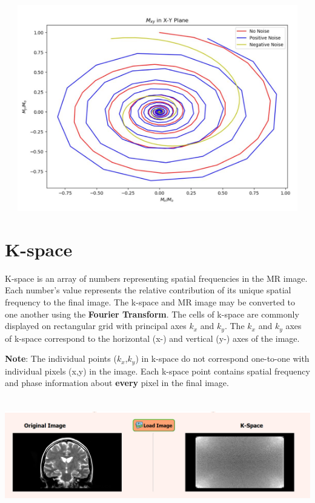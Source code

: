 \documentclass[18pt]{extarticle}
\begin{document}
\begin{center}
	\includegraphics[width=15cm, height=9cm]{mxy}
\end{center}

\section{K-space}
\hspace*{6mm}\large K-space is an array of numbers representing spatial frequencies in the MR image.
Each number's value represents the relative contribution of its unique spatial frequency to the final image.
The k-space and MR image may be converted to one another using the \textbf{Fourier Transform}. The cells of k-space are commonly displayed on rectangular grid with principal axes $k_x$ and $k_y$. The $k_x$ and $k_y$ axes of k-space correspond to the horizontal (x-) and vertical (y-) axes of the image.
\par
\large \textbf{Note}: The individual points ($k_x$,$k_y$) in k-space do not correspond one-to-one with individual pixels (x,y) in the image. Each k-space point contains spatial frequency and phase information about \textbf{every} pixel in the final image.
\begin{center}
	\includegraphics[width=15cm, height=5cm]{ft}
\end{center}
\end{document}
